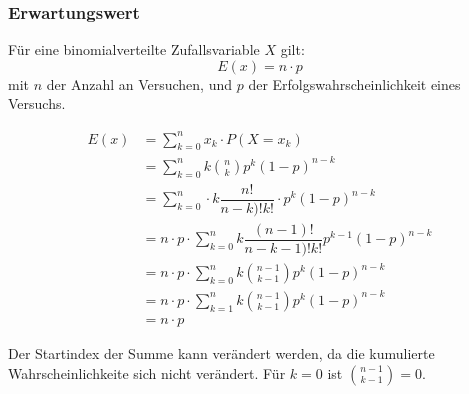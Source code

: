 \documentclass[../MAIN/main.tex]{subfiles}
\begin{document}
\subsubsection{Erwartungswert}
\begin{Theorem}
  Für eine binomialverteilte Zufallsvariable $X$ gilt:
  $$E(x)=n\cdot p$$
  mit $n$ der Anzahl an Versuchen, und $p$ der Erfolgswahrscheinlichkeit eines Versuchs.
\end{Theorem}
\begin{Beweis}
  \begin{center}
    \begin{align*}
      E(x)  &= \sum_{k=0}^{n} x_k \cdot P(X=x_k)\\
            &= \sum_{k=0}^{n} k  {n \choose k} p^k (1-p)^{n-k}\\
            &= \sum_{k=0}^{n} \cdot k \dfrac{n!}{n-k)!k!} \cdot p^k (1-p)^{n-k}\\
            &= n\cdot p\cdot \sum_{k=0}^{n} k \dfrac{(n-1)!}{n-k-1)!k!}  p^{k-1} (1-p)^{n-k}\\
            &= n\cdot p\cdot \sum_{k=0}^{n} k  {n-1 \choose k-1} p^k (1-p)^{n-k}\\
            &= n\cdot p\cdot \sum_{k=1}^{n} k  {n-1 \choose k-1} p^k (1-p)^{n-k}\\
            &= n\cdot p
    \end{align*}
  \end{center}
  \begin{Bemerkung}
    Der Startindex der Summe kann verändert werden, da die kumulierte Wahrscheinlichkeite sich nicht verändert. Für $k=0$ ist ${n-1\choose k-1}=0$.
  \end{Bemerkung}
\end{Beweis}
\end{document}
